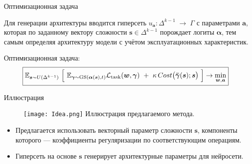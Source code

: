 \documentclass{beamer}
\begin{document}
\begin{frame}{Оптимизационная задача}

Для генерации архитектуры вводится гиперсеть
$u_{\boldsymbol a}\colon \Delta^{k-1} \;\rightarrow\; \Gamma$  с параметрами $\boldsymbol a$, которая по заданному вектору сложности $\boldsymbol{s}\in\Delta^{k-1}$ порождает логиты
$\boldsymbol{\alpha}$, тем самым определяя архитектуру модели с учётом эксплуатационных характеристик.

\vspace{20pt}

\vspace{20pt}
Оптимизационная задача:
$$ \hspace{-5pt}\boxed{\mathbb E_{\boldsymbol s\sim U(\Delta^{k-1})} \ \Bigl[ \ {\mathbb E_{\boldsymbol\gamma\sim\mathrm{GS}(\boldsymbol\alpha(\boldsymbol s),t)} \mathcal L_{\text{task}}(\boldsymbol w,\boldsymbol\gamma)} \ +\  \kappa\,Cost\bigl(\boldsymbol{\bar\gamma}(\boldsymbol s);\boldsymbol s\bigr) \ \Bigr] \rightarrow \min_{\boldsymbol w,\boldsymbol a}}  
$$


\end{frame}


\begin{frame}{Иллюстрация}

\begin{figure}
        \centering
        \texttt{[image: Idea.png]}
        Иллюстрация предлагаемого метода.
       
\end{figure}

\begin{itemize}
    \item Предлагается использовать векторный параметр сложности $\boldsymbol{s}$, компоненты которого --- коэффициенты регуляризации по соответствующим операциям.
    \item Гиперсеть на основе $\boldsymbol{s}$ генерирует архитектурные параметры для нейросети.
\end{itemize}

\end{frame}
\end{document}
